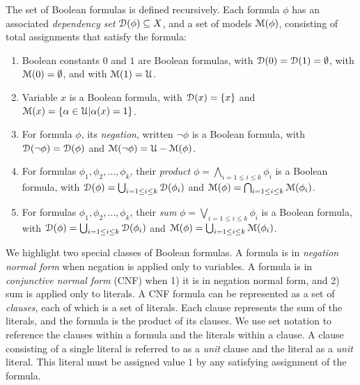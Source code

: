 \documentclass[letterpaper,USenglish,cleveref, autoref, thm-restate]{lipics-v2021}
\newcommand{\boolnot}{\neg}
\newcommand{\varset}{X}
\newcommand{\dependencyset}{{\cal D}}
\newcommand{\assign}{\alpha}
\newcommand{\uassign}{{\cal U}}
\newcommand{\modelset}{{\cal M}}
\begin{document}
\begin{definition}
  The set of Boolean formulas is defined recursively.  Each
  formula $\phi$ has an associated {\em dependency set}
  $\dependencyset(\phi)  \subseteq \varset$, and a set of models $\modelset(\phi)$,
  consisting of total assignments that satisfy the formula:
  \begin{enumerate}
  \item Boolean constants $0$ and $1$ are Boolean formulas,
    with $\dependencyset(0) = \dependencyset(1) = \emptyset$, with $\modelset(0) = \emptyset$, and with $\modelset(1) = \uassign$.
  \item Variable $x$ is a Boolean formula, with $\dependencyset(x) = \{x\}$
    and $\modelset(x) = \{\assign \in \uassign | \assign(x)=1\}$.
  \item For formula $\phi$, its {\em negation}, written $\boolnot \phi$ is a Boolean formula,
    with $\dependencyset(\boolnot \phi) = \dependencyset(\phi)$ and $\modelset(\boolnot \phi) = \uassign - \modelset(\phi)$.
  \item For formulas $\phi_1, \phi_2, \ldots, \phi_k$, their {\em product} $\phi = \bigwedge_{i=1 \leq i \leq k} \phi_i$ is a Boolean formula, with
      $\dependencyset(\phi) = \bigcup_{i=1 \leq i \leq k} \dependencyset(\phi_i)$ and
      $\modelset(\phi) = \bigcap_{i=1 \leq i \leq k} \modelset(\phi_i)$.
  \item For formulas $\phi_1, \phi_2, \ldots, \phi_k$, their {\em sum} $\phi = \bigvee_{i=1 \leq i \leq k} \phi_i$ is a Boolean formula, with
      $\dependencyset(\phi) = \bigcup_{i=1 \leq i \leq k} \dependencyset(\phi_i)$ and
      $\modelset(\phi) = \bigcup_{i=1 \leq i \leq k} \modelset(\phi_i)$.
  \end{enumerate}
\label{def:boolean}
\end{definition}


  We highlight two special classes of Boolean formulas.  A formula is
  in {\em negation normal form} when negation is applied only to variables.  A
  formula is in {\em conjunctive normal form} (CNF) when 1) it is in
  negation normal form, and 2) sum is applied only to literals.  A CNF
  formula can be represented as a set of {\em clauses}, each of which is a
  set of literals.  Each clause represents the sum of the
  literals, and the formula is the product of its clauses.  We use
  set notation to reference the clauses within a formula and the
  literals within a clause.  A clause consisting of a single literal is referred to as a {\em unit} clause and the literal as a {\em unit} literal.
This literal must be assigned value $1$ by any satisfying assignment of the formula.
\end{document}

